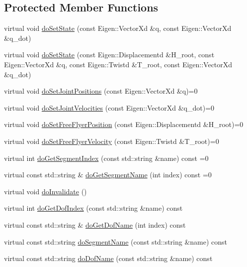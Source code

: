 \subsection*{Protected Member Functions}
\begin{DoxyCompactItemize}
\item 
virtual void \hyperlink{classocra_1_1Model_a3281cf832fe0e60fc087acda97064bb2}{do\+Set\+State} (const Eigen\+::\+Vector\+Xd \&q, const Eigen\+::\+Vector\+Xd \&q\+\_\+dot)
\item 
virtual void \hyperlink{classocra_1_1Model_adab6b86806c9298ecba14da065badacf}{do\+Set\+State} (const Eigen\+::\+Displacementd \&H\+\_\+root, const Eigen\+::\+Vector\+Xd \&q, const Eigen\+::\+Twistd \&T\+\_\+root, const Eigen\+::\+Vector\+Xd \&q\+\_\+dot)
\item 
virtual void \hyperlink{classocra_1_1Model_a1353dd716f80843ea11ff6193c512b13}{do\+Set\+Joint\+Positions} (const Eigen\+::\+Vector\+Xd \&q)=0
\item 
virtual void \hyperlink{classocra_1_1Model_a770a539312a2e805fcca2af3529ecff9}{do\+Set\+Joint\+Velocities} (const Eigen\+::\+Vector\+Xd \&q\+\_\+dot)=0
\item 
virtual void \hyperlink{classocra_1_1Model_a4174e9fd30f913f43e516bbef9583ca2}{do\+Set\+Free\+Flyer\+Position} (const Eigen\+::\+Displacementd \&H\+\_\+root)=0
\item 
virtual void \hyperlink{classocra_1_1Model_aad824e82f724f24e3769c74355162bda}{do\+Set\+Free\+Flyer\+Velocity} (const Eigen\+::\+Twistd \&T\+\_\+root)=0
\item 
virtual int \hyperlink{classocra_1_1Model_aede6166f1991c23db634aa5ff16b6584}{do\+Get\+Segment\+Index} (const std\+::string \&name) const =0
\item 
virtual const std\+::string \& \hyperlink{classocra_1_1Model_a0f339ce01a0871a19b0f952bdda82822}{do\+Get\+Segment\+Name} (int index) const =0
\item 
virtual void \hyperlink{classocra_1_1Model_a902663196e1c7535c27b755cf4436693}{do\+Invalidate} ()
\item 
virtual int \hyperlink{classocra_1_1Model_a0f4f5c643b386b3d29c6cb66ab38a5cd}{do\+Get\+Dof\+Index} (const std\+::string \&name) const
\item 
virtual const std\+::string \& \hyperlink{classocra_1_1Model_a81ea95179ef3cca4ad98c3c525eaaedf}{do\+Get\+Dof\+Name} (int index) const
\item 
virtual const std\+::string \hyperlink{classocra_1_1Model_a887c6805af16d21ec54ef104f79f244d}{do\+Segment\+Name} (const std\+::string \&name) const
\item 
virtual const std\+::string \hyperlink{classocra_1_1Model_a664454a77b21d2f5501c2aaf9652c058}{do\+Dof\+Name} (const std\+::string \&name) const
\end{DoxyCompactItemize}
